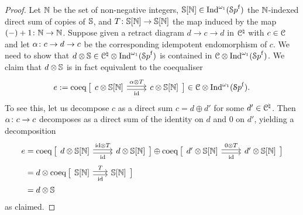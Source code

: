 \begin{proof}
Let $\mathbb{N}$ be the set of non-negative integers, $\mathbb{S}[\mathbb{N}] \in \operatorname{Ind}^{\omega_1}({\mathcal Sp}^{\mathrm{f}})$ the $\mathbb{N}$-indexed direct sum of copies of $\mathbb{S}$, and $T\colon \mathbb{S}[\mathbb{N}] \to \mathbb{S}[\mathbb{N}]$ the map induced by the map $(-)+1\colon \mathbb{N} \to \mathbb{N}$.
Suppose given a retract diagram $d \to c \to d$ in $\mathcal C^{\natural}$ with $c \in \mathcal C$ and let $\alpha\colon c \to d \to c$ be the corresponding idempotent endomorphism of $c$. We need to show that $d \otimes \mathbb{S} \in \mathcal C^{\natural} \otimes \operatorname{Ind}^{\omega_1}({\mathcal Sp}^{\mathrm{f}})$ is contained in $\mathcal C \otimes \operatorname{Ind}^{\omega_1}({\mathcal Sp}^{\mathrm{f}})$.
We claim that $d \otimes \mathbb{S}$ is in fact equivalent to the coequaliser 
\[
e := \coeq\big[\begin{tikzcd}c \otimes \SS[\NN] \ar[r,yshift=-2pt,"\id"']\ar[r,yshift=2pt,"\alp\otimes T"] & c \otimes \SS[\NN] \end{tikzcd}\big] \in \C \otimes \Ind^{\omega_1}(\Spaf) .
\]
To see this, let us decompose $c$ as a direct sum $c = d \oplus d'$ for some $d'\in \mathcal C^{\natural}$. Then $\alpha\colon c \to c$ decomposes as a direct sum of the identity on $d$ and $0$ on $d'$, yielding a decomposition 
\begin{align*}
e &= \coeq\big[\begin{tikzcd}[ampersand replacement=\&]d \otimes \SS[\NN] \ar[r,yshift=-2pt,"\id"']\ar[r,yshift=2pt,"\id\otimes T"] \& d \otimes \SS[\NN] \end{tikzcd}\big] \oplus \coeq\big[\begin{tikzcd}[ampersand replacement=\&]d' \otimes \SS[\NN] \ar[r,yshift=-2pt,"\id"']\ar[r,yshift=2pt,"0\otimes T"] \& d' \otimes \SS[\NN] \end{tikzcd}\big]\\
&= d\otimes \coeq\big[\begin{tikzcd}[ampersand replacement=\&, column sep=18pt]\SS[\NN] \ar[r,yshift=-2pt,"\id"']\ar[r,yshift=2pt,"T"] \& \SS[\NN] \end{tikzcd}\big]  \\
&= d \otimes \SS
\end{align*}
as claimed.
\end{proof}



